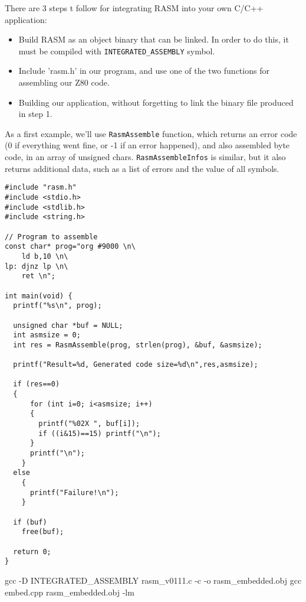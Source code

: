 \begin{xen}
There are 3 steps t follow for integrating  RASM into your own C/C++ application:
\begin{itemize}
\item Build RASM as an object binary that can be linked. In order to do this, it must be compiled with  \texttt{INTEGRATED\_ASSEMBLY} symbol.
\item Include 'rasm.h' in our program, and use one of the two functions for assembling our Z80 code.
\item Building our application, without forgetting to link the binary file produced in step 1.
\end{itemize}

As a first example, we'll use \texttt{RasmAssemble} function, which returns an error code (0 if everything went fine, or -1 if an error happened), and also assembled byte code, in an array of unsigned chars.
\texttt{RasmAssembleInfos} is similar, but it also returns additional data, such as a list of errors and the value of all symbols.
\end{xen}


\begin{verbatim}
#include "rasm.h"
#include <stdio.h>
#include <stdlib.h>
#include <string.h>

// Program to assemble
const char* prog="org #9000 \n\
    ld b,10 \n\
lp: djnz lp \n\
    ret \n";

int main(void) {
  printf("%s\n", prog);

  unsigned char *buf = NULL;
  int asmsize = 0;
  int res = RasmAssemble(prog, strlen(prog), &buf, &asmsize);

  printf("Result=%d, Generated code size=%d\n",res,asmsize);

  if (res==0)
  {
      for (int i=0; i<asmsize; i++)
      {
        printf("%02X ", buf[i]);
        if ((i&15)==15) printf("\n");
      }
      printf("\n");
    }
  else
    {
      printf("Failure!\n");
    }

  if (buf)
    free(buf);

  return 0;
}
\end{verbatim}


\begin{code}
gcc -D INTEGRATED\_ASSEMBLY rasm\_v0111.c -c -o rasm\_embedded.obj
gcc embed.cpp rasm\_embedded.obj -lm
\end{code}

